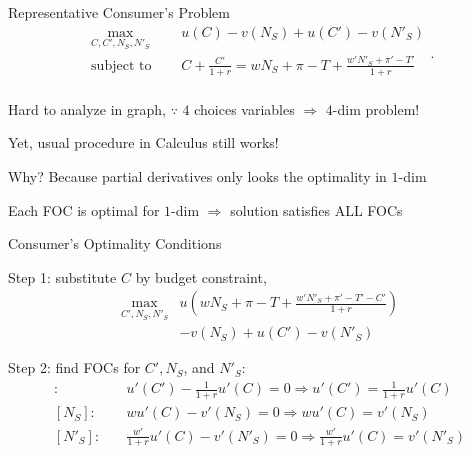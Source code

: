 \documentclass[11pt,aspectratio=169,usenames,dvipsnames]{beamer}
\let\tempone\itemize
\let\temptwo\enditemize
\renewenvironment{itemize}{\tempone\addtolength{\itemsep}{\fill}}{\temptwo}
\begin{document}
\begin{frame}{Representative Consumer's Problem}
\label{slide:Representative_Consumer_s_Problem}
%
\begin{equation}
\label{eq:consumer_problem}
    \begin{split}
        \max_{C, C', N_{S}, N'_{S}} \quad
            & u( C ) - v( N_{S}) + u( C' ) - v( N'_{S} )
        \\
        \text{subject to } \quad
            & C + \frac{C'}{1+r} =
            w N_{S} + \pi - T
            + \frac{w' N'_{S} + \pi' - T'}{1+r}
        \\
    \end{split}
.\end{equation}
%
\begin{itemize}
    \item Hard to analyze in graph, $ \because $ $ 4 $ choices variables $ \Rightarrow  $ $ 4 $-dim problem!
    \item Yet, usual procedure in Calculus still works!
    \item Why? Because \alert{partial derivatives} only looks the optimality in \alert{$ 1 $-dim}
    \item Each FOC is optimal for $ 1 $-dim $ \Rightarrow  $ solution satisfies ALL FOCs
\end{itemize}
\end{frame}

\begin{frame}{Consumer's Optimality Conditions}
\label{slide:Consumer_s_Optimality_Conditions}
\begin{itemize}
    \item Step 1: substitute $ C $ by budget constraint,
        \begin{align*}
            \max_{C', N_{S}, N'_{S}}
                & u\left(
                    w N_{S} + \pi - T + \frac{w' N'_{S} + \pi' - T' - C'}{1+r}
                   \right)
            \\
                & - v( N_{S} ) + u( C' ) - v( N'_{S} )
        \end{align*}
    \item Step 2: find FOCs for $ C', N_{S} $, and $ N'_{S} $:
    \begin{align*}
        [C']: \quad
            & u'( C' ) - \frac{1}{1+r}u'( C ) = 0 \Rightarrow u'( C' ) = \frac{1}{1+r} u'( C )
        \\
        [ N_{S} ]: \quad
            & w u'( C ) - v'( N_{S} ) = 0 \Rightarrow w u'( C ) = v'( N_{S} )
        \\
        [ N'_{S} ]: \quad
            & \frac{w'}{1+r} u'( C ) - v'( N'_{S} ) = 0 \Rightarrow \frac{w'}{1+r} u'( C ) = v'( N'_{S} )
    \end{align*}
\end{itemize}
\end{frame}
\end{document}
